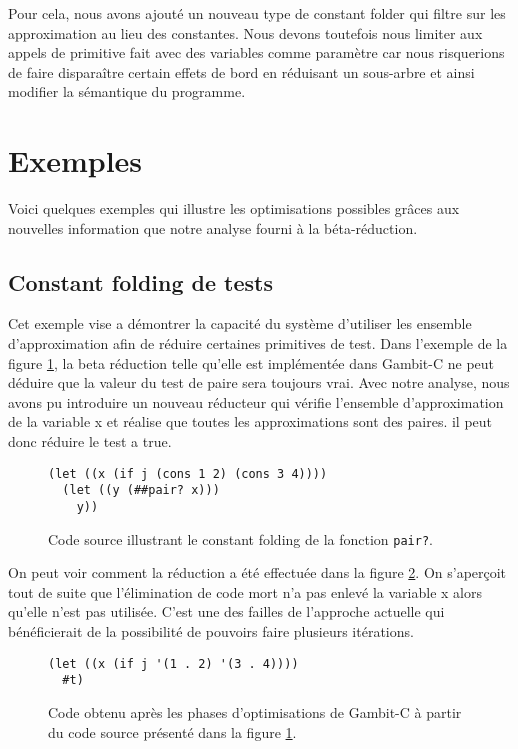 Pour cela, nous avons ajouté un nouveau type de constant folder qui
filtre sur les approximation au lieu des constantes.  Nous devons
toutefois nous limiter aux appels de primitive fait avec des variables
comme paramètre car nous risquerions de faire disparaître certain
effets de bord en réduisant un sous-arbre et ainsi modifier la
sémantique du programme.


\section{Exemples}

Voici quelques exemples qui illustre les optimisations possibles grâces aux
nouvelles information que notre analyse fourni à la béta-réduction.

\subsection{\og Constant folding \fg de tests}

Cet exemple vise a démontrer la capacité du système d'utiliser les
ensemble d'approximation afin de réduire certaines primitives de
test. Dans l'exemple de la figure \ref{cfa-ex1-source}, la beta
réduction telle qu'elle est implémentée dans Gambit-C ne peut déduire
que la valeur du test de paire sera toujours vrai.  Avec notre
analyse, nous avons pu introduire un nouveau réducteur qui vérifie
l'ensemble d'approximation de la variable x et réalise que toutes les
approximations sont des paires. il peut donc réduire le test a true.

  \begin{figure}[htbp!]
    \begin{lstlisting}
(let ((x (if j (cons 1 2) (cons 3 4))))
  (let ((y (##pair? x)))
    y))
    \end{lstlisting}
    \caption{Code source illustrant le \og constant folding \fg de la
      fonction \texttt{pair?}.}
    \label{cfa-ex1-source}
  \end{figure}

On peut voir comment la réduction a été effectuée dans la figure
\ref{cfa-ex1-out}. On s'aperçoit tout de suite que l'élimination de
code mort n'a pas enlevé la variable x alors qu'elle n'est pas
utilisée. C'est une des failles de l'approche actuelle qui
bénéficierait de la possibilité de pouvoirs faire plusieurs
itérations.

 \begin{figure}[htbp!]
    \begin{lstlisting}
(let ((x (if j '(1 . 2) '(3 . 4))))
  #t)
    \end{lstlisting}
    \caption{Code obtenu après les phases d'optimisations de Gambit-C à
      partir du code source présenté dans la figure \ref{cfa-ex1-source}.}
    \label{cfa-ex1-out}
  \end{figure}


